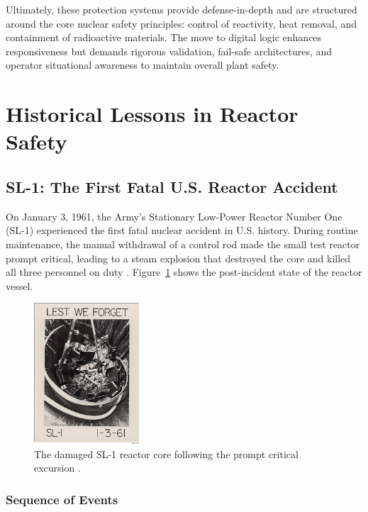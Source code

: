 \documentclass[12pt]{article}
\begin{document}
Ultimately, these protection systems provide defense-in-depth and are structured around the core nuclear safety principles: control of reactivity, heat removal, and containment of radioactive materials. The move to digital logic enhances responsiveness but demands rigorous validation, fail-safe architectures, and operator situational awareness to maintain overall plant safety.
\section{Historical Lessons in Reactor Safety}
\label{sec:accidents}

\subsection{SL-1: The First Fatal U.S. Reactor Accident}

On January 3, 1961, the Army’s Stationary Low-Power Reactor Number One (SL-1) experienced the first fatal nuclear accident in U.S. history. During routine maintenance, the manual withdrawal of a control rod made the small test reactor prompt critical, leading to a steam explosion that destroyed the core and killed all three personnel on duty \autocite{sl1report}. Figure~\ref{fig:sl1diagram} shows the post-incident state of the reactor vessel.

\begin{figure}[H]
    \centering
    \includegraphics[width=0.35\textwidth]{sl1diagram.jpg}
    \caption{The damaged SL-1 reactor core following the prompt critical excursion \autocite{sl1report}.}
    \label{fig:sl1diagram}
\end{figure}

\subsubsection{Sequence of Events}
\end{document}
